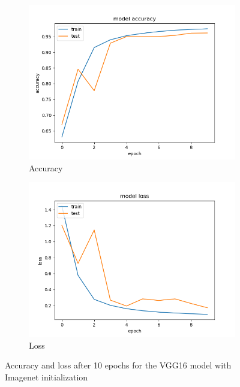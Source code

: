 \documentclass{article}
\theoremstyle{definition}
\theoremstyle{remark}
\begin{document}
\begin{figure}[h!]
\centering
\begin{subfigure}{.5\textwidth}
  \centering
  \includegraphics[width=1.2\linewidth]{img/pre-trained_models/vgg16_pretrained_acc.png}
  \caption{Accuracy}
  \label{fig:sub1}
\end{subfigure}%
\begin{subfigure}{.5\textwidth}
  \centering
  \includegraphics[width=1.2\linewidth]{img/pre-trained_models/vgg16_pretrained_loss.png}
  \caption{Loss}
  \label{fig:sub2}
\end{subfigure}
\caption{Accuracy and loss after 10 epochs for the VGG16 model with Imagenet initialization}
\label{fig:vgg16_ten_epochs_imagenet}
\end{figure}
\end{document}
